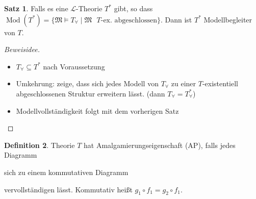 \documentclass[12pt,parskip=full]{scrartcl}
\theoremstyle{definition}
\newtheorem{theorem}{Satz}[section]
\newtheorem{definition}[theorem]{Definition}
\begin{document}
 	\begin{theorem}
 		Falls es eine $\mathcal{L}$-Theorie $T^*$ gibt, so dass $\operatorname{Mod}(T^*) = \{ \mathfrak{M} \models T_\forall \mid \mathfrak{M} \text{ $T$-ex. abgeschlossen} \}$. Dann ist $T^*$ Modellbegleiter von $T$.
 	\end{theorem}
 
 	\begin{proof}[Beweisidee]
 		\begin{itemize}
 			\item $T_\forall \subseteq T^*$ nach Voraussetzung
 			\item Umkehrung: zeige, dass sich jedes Modell von $T_\forall$ zu einer $T$-existentiell abgeschlossenen Struktur erweitern lässt. (dann $T_\forall = T_\forall^*$)
 			\item Modellvollständigkeit folgt mit dem vorherigen Satz
 		\end{itemize}
 	\end{proof}
 
 	\begin{definition}
 		Theorie $T$ hat Amalgamierungseigenschaft (AP), falls jedes Diagramm
 		
 		\begin{center}
 		\end{center}
 	
		sich zu einem kommutativen Diagramm
		
		\begin{center}
		\end{center}
	
		vervollständigen lässt. Kommutativ heißt $g_1 \circ f_1 = g_2 \circ f_1$.
 	\end{definition}
 
\end{document}
